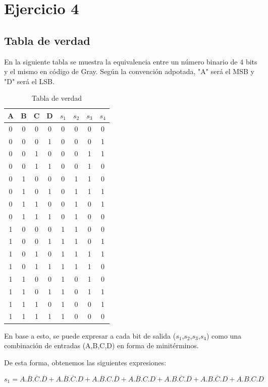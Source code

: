 \section{Ejercicio 4}

\subsection{Tabla de verdad}
En la siguiente tabla se muestra la equivalencia entre un n\'umero binario de 4 bits y el mismo en c\'odigo de Gray. Seg\'un la convenci\'on adpotada, "A" ser\'a el MSB y "D" ser\'a el LSB.

\begin{table}[H]\caption{Tabla de verdad}
\centering
\begin{tabular}{cccc|cccc}
A & B & C & D & $s_{1}$ & $s_{2}$ & $s_{3}$ & $s_{4}$ \\ \hline
0 & 0 & 0 & 0 & 0  & 0  & 0  & 0  \\
0 & 0 & 0 & 1 & 0  & 0  & 0  & 1  \\
0 & 0 & 1 & 0 & 0  & 0  & 1  & 1  \\
0 & 0 & 1 & 1 & 0  & 0  & 1  & 0  \\
0 & 1 & 0 & 0 & 0  & 1  & 1  & 0  \\
0 & 1 & 0 & 1 & 0  & 1  & 1  & 1  \\
0 & 1 & 1 & 0 & 0  & 1  & 0  & 1  \\
0 & 1 & 1 & 1 & 0  & 1  & 0  & 0  \\
1 & 0 & 0 & 0 & 1  & 1  & 0  & 0  \\
1 & 0 & 0 & 1 & 1  & 1  & 0  & 1  \\
1 & 0 & 1 & 0 & 1  & 1  & 1  & 1  \\
1 & 0 & 1 & 1 & 1  & 1  & 1  & 0  \\
1 & 1 & 0 & 0 & 1  & 0  & 1  & 0  \\
1 & 1 & 0 & 1 & 1  & 0  & 1  & 1  \\
1 & 1 & 1 & 0 & 1  & 0  & 0  & 1  \\
1 & 1 & 1 & 1 & 1  & 0  & 0  & 0
\end{tabular}
\end{table}

En base a esto, se puede expresar a cada bit de salida ($s_{1}$,$s_{2}$,$s_{3}$,$s_{4}$) como una combinaci\'on de entradas (A,B,C,D) en forma de minit\'erminos.

De esta forma, obtenemos las siguientes expresiones:

\begin{equation}\label{s1_mini}
    s_{1} = A.\overline{B}.\overline{C}.\overline{D} +A.\overline{B}.\overline{C}.D+A.\overline{B}.C.\overline{D}+A.\overline{B}.C.D+A.B.\overline{C}.\overline{D}+A.B.\overline{C}.D+A.B.C.D
\end{equation}

